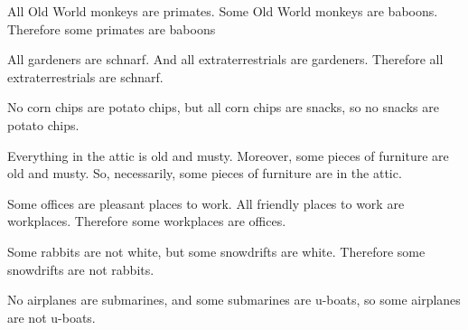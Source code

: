 \begin{exercises}
\item All Old World monkeys are primates. Some Old World monkeys are baboons. Therefore some primates are baboons


\item All gardeners are schnarf. And all extraterrestrials are gardeners. Therefore all extraterrestrials are schnarf.


\item No corn chips are potato chips, but all corn chips are snacks, so no snacks are potato chips.


\item Everything in the attic is old and musty. Moreover, some pieces of furniture are old and musty. So, necessarily, some pieces of furniture are in the attic.



\item Some offices are pleasant places to work. All friendly places to work are workplaces. Therefore some workplaces are offices.



\item Some rabbits are not white, but some snowdrifts are white. Therefore some snowdrifts are not rabbits.


\item No airplanes are submarines, and some submarines are u-boats, so some airplanes are not u-boats.



\end{exercises}
